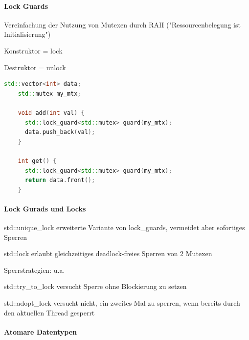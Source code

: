 \documentclass[10pt]{article}
\begin{document}
\paragraph{Lock Guards}

\begin{itemize*}
  \item Vereinfachung der Nutzung von Mutexen durch RAII ("Ressourcenbelegung ist Initialisierung")
  \item Konstruktor = lock
  \item Destruktor = unlock
\end{itemize*}

\begin{lstlisting}[language=C++]
    std::vector<int> data;
    std::mutex my_mtx;
  
    void add(int val) {
      std::lock_guard<std::mutex> guard(my_mtx);
      data.push_back(val);
    }
  
    int get() {
      std::lock_guard<std::mutex> guard(my_mtx);
      return data.front();
    }
    \end{lstlisting}

\paragraph{Lock Gurads und Locks}

\begin{itemize*}
  \item std::unique\_lock erweiterte Variante von lock\_guards, vermeidet aber sofortiges Sperren
  \item std::lock erlaubt gleichzeitiges deadlock-freies Sperren von 2 Mutexen
  \item Sperrstrategien: u.a.
  \begin{itemize*}
    \item std::try\_to\_lock versucht Sperre ohne Blockierung zu setzen
    \item std::adopt\_lock versucht nicht, ein zweites Mal zu sperren, wenn bereits durch den aktuellen Thread gesperrt
  \end{itemize*}
\end{itemize*}

\paragraph{Atomare Datentypen}
\end{document}
